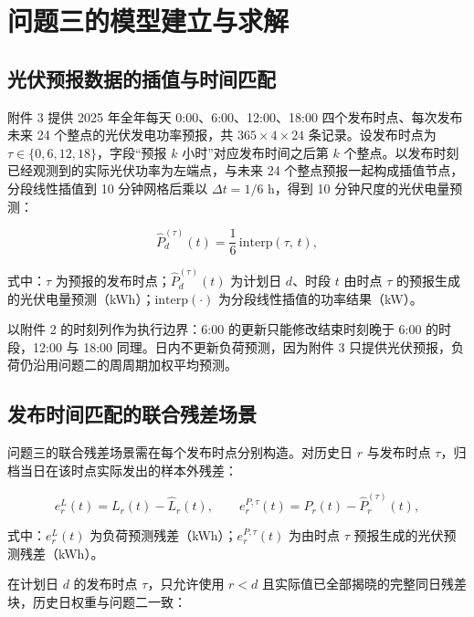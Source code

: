 \section{问题三的模型建立与求解}

\subsection{光伏预报数据的插值与时间匹配}

附件 3 提供 2025 年全年每天 0:00、6:00、12:00、18:00 四个发布时点、每次发布未来 24 个整点的光伏发电功率预报，共 $365\times4\times24$ 条记录。设发布时点为 $\tau\in\{0,6,12,18\}$，字段``预报 $k$ 小时''对应发布时间之后第 $k$ 个整点。以发布时刻已经观测到的实际光伏功率为左端点，与未来 24 个整点预报一起构成插值节点，分段线性插值到 10 分钟网格后乘以 $\Delta t = 1/6$ h，得到 10 分钟尺度的光伏电量预测：

\begin{equation}
  \widehat{P}^{(\tau)}_d(t) = \frac{1}{6}\,\mathrm{interp}\left(\tau,\, t\right),
  \label{eq:q3_pv}
\end{equation}

式中：$\tau$ 为预报的发布时点；$\widehat{P}^{(\tau)}_d(t)$ 为计划日 $d$、时段 $t$ 由时点 $\tau$ 的预报生成的光伏电量预测（kWh）；$\mathrm{interp}(\cdot)$ 为分段线性插值的功率结果（kW）。

以附件 2 的时刻列作为执行边界：6:00 的更新只能修改结束时刻晚于 6:00 的时段，12:00 与 18:00 同理。日内不更新负荷预测，因为附件 3 只提供光伏预报，负荷仍沿用问题二的周周期加权平均预测。

\subsection{发布时间匹配的联合残差场景}

问题三的联合残差场景需在每个发布时点分别构造。对历史日 $r$ 与发布时点 $\tau$，归档当日在该时点实际发出的样本外残差：

\begin{equation}
  e^L_r(t) = L_r(t) - \widehat{L}_r(t),
  \qquad
  e^{P,\tau}_r(t) = P_r(t) - \widehat{P}^{(\tau)}_r(t),
  \label{eq:q3_residual}
\end{equation}

式中：$e^L_r(t)$ 为负荷预测残差（kWh）；$e^{P,\tau}_r(t)$ 为由时点 $\tau$ 预报生成的光伏预测残差（kWh）。

在计划日 $d$ 的发布时点 $\tau$，只允许使用 $r<d$ 且实际值已全部揭晓的完整同日残差块，历史日权重与问题二一致：

